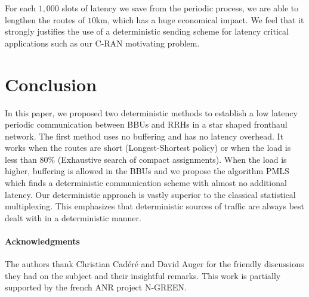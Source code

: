 \documentclass[a4paper,10pt]{IEEEtran}
\begin{document}
     For each $1,000$ slots of latency we save from the periodic process, we are able to lengthen the routes of $10$km, which has a huge economical impact. We feel that it strongly justifies the use of a deterministic sending scheme for latency critical applications such as our C-RAN motivating problem.     

 \section{Conclusion}
In this paper, we proposed two deterministic methods to establish a low latency periodic communication between BBUs and RRHs in 
a star shaped fronthaul network. The first method uses no buffering and has no latency overhead. It works when the routes are short (Longest-Shortest policy) or when the load is less than $80\%$ (Exhaustive search of compact assignments).  
When the load is higher, buffering is allowed in the BBUs and we propose the algorithm PMLS which  finds a deterministic communication scheme with almost no additional latency. Our deterministic approach is vastly superior to the classical statistical multiplexing. This emphasizes that deterministic sources of traffic are always best dealt with in a deterministic manner.  

 \paragraph*{Acknowledgments} The authors thank Christian Cad\'er\'e and David Auger for the friendly discussions
 they had on the subject and their insightful remarks. This work is partially supported by the french ANR project N-GREEN.



\end{document}
